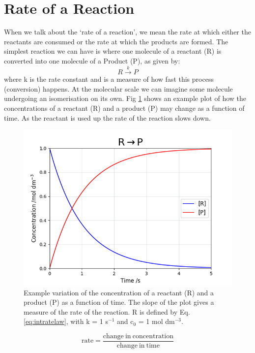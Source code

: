 \documentclass[	DIV=calc,%
							paper=a4,%
							fontsize=11pt,%
							twocolumn]{scrartcl}	 					%
\begin{document}
\section*{Rate of a Reaction}
When we talk about the `rate of a reaction', we mean the rate at which either the reactants are consumed or the rate at which the products are formed. The simplest reaction we can have is where one molecule of a reactant (R) is converted into one molecule of a Product (P), as given by:
\begin{equation}
    R \xrightarrow{k} P
\end{equation}
where k is the rate constant and is a measure of how fast this process (conversion) happens. At the molecular scale we can imagine some molecule undergoing an isomerisation on its own.
Fig \ref{fig:rate} shows an example plot of how the concentrations of a reactant (R) and a product (P) may change as a function of time. As the reactant is used up the rate of the reaction slows down.
\begin{figure}[h]
    \centering
    \includegraphics[width=\linewidth]{figure_1.png}
    \captionsetup{format=plain}
    \caption{Example variation of the concentration of a reactant (R) and a product (P) as a function of time. The slope of the plot gives a measure of the rate of the reaction. R is defined by Eq. \ref{eq:intratelaw}, with k = 1 s$^{-1}$ and c$_0$ = 1 mol dm$^{-3}$.}
    \label{fig:rate}
\end{figure}

\begin{equation}
    \mathrm{rate} = \frac{\mathrm{change~in~concentration}}{\mathrm{change~in~time}}
\end{equation}
\end{document}
